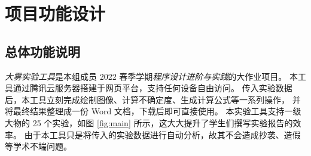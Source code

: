 \section{项目功能设计}

\subsection{总体功能说明}

\emph{大雾实验工具}是本组成员 2022 春季学期\textit{程序设计进阶与实践}的大作业项目。
本工具通过腾讯云服务器搭建于网页平台，支持任何设备自由访问。
传入实验数据后，本工具立刻完成绘制图像、计算不确定度、生成计算公式等一系列操作，
并将最终结果整理成一份 Word 文档，下载后即可直接使用。
本实验工具支持一级大物的 25 个实验，如图 \ref{fig:main} 所示，这大大提升了学生们撰写实验报告的效率。
由于本工具只是将传入的实验数据进行自动分析，故其不会造成抄袭、造假等学术不端问题。

